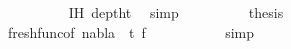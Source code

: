 \begin{isabellebody}
\ \ \ \ \ \ \ \ \isamarkupfalse%
\ {}{\isacharparenleft}{\kern0pt}{}{\isacharparenright}{\kern0pt}\ IH\ deptht{}\ \isamarkupfalse%
\ simp\isanewline
\ \ \ \ \ \ \isamarkupfalse%
\ \isamarkupfalse%
\ {\isacharquery}{\kern0pt}thesis\ \isanewline
\ \ \ \ \ \ \ \ \isamarkupfalse%
\ {}{\isacharparenleft}{\kern0pt}{}{\isacharcomma}{\kern0pt}{}{\isacharparenright}{\kern0pt}\ fresh{\isacharunderscore}{\kern0pt}func{\isacharbrackleft}{\kern0pt}of\ nabla\ {\isacharunderscore}{\kern0pt}\ t{}\ f{\isacharbrackright}{\kern0pt}\ \isanewline
\ \ \ \ \ \ \ \ \isamarkupfalse%
\ simp\isanewline
\ \ \ \ \isamarkupfalse%
\isanewline
\ \ \isamarkupfalse%
%
\endisatagproof
{\isafoldproof}%
%
\isadelimproof
\isanewline
%
\endisadelimproof
%
\isadelimtheory
%
\endisadelimtheory
%
\isatagtheory
%
\endisatagtheory
{\isafoldtheory}%
%
\isadelimtheory
%
\endisadelimtheory
%
\end{isabellebody}%
\endinput

